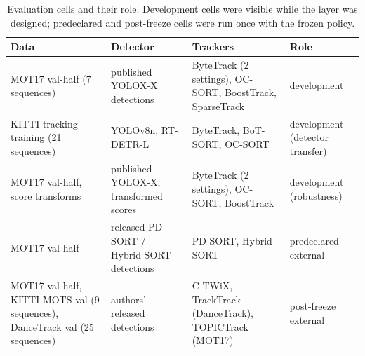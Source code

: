 \begin{table}[t]
\caption{Evaluation cells and their role. Development cells were visible while
the layer was designed; predeclared and post-freeze cells were run once with
the frozen policy.}
\label{tab:data}
\centering\footnotesize
\setlength{\tabcolsep}{4pt}
\begin{tabular}{@{}>{\raggedright\arraybackslash}p{36mm}>{\raggedright\arraybackslash}p{32mm}>{\raggedright\arraybackslash}p{50mm}>{\raggedright\arraybackslash}p{30mm}@{}}
\toprule
Data & Detector & Trackers & Role\\
\midrule
MOT17 val-half (7 sequences) & published YOLOX-X detections & ByteTrack (2 settings), OC-SORT, BoostTrack, SparseTrack & development\\
KITTI tracking training (21 sequences) & YOLOv8n, RT-DETR-L & ByteTrack, BoT-SORT, OC-SORT & development (detector transfer)\\
MOT17 val-half, score transforms & published YOLOX-X, transformed scores & ByteTrack (2 settings), OC-SORT, BoostTrack & development (robustness)\\
MOT17 val-half & released PD-SORT / Hybrid-SORT detections & PD-SORT, Hybrid-SORT & predeclared external\\
MOT17 val-half, KITTI MOTS val (9 sequences), DanceTrack val (25 sequences) & authors' released detections & C-TWiX, TrackTrack (DanceTrack), TOPICTrack (MOT17) & post-freeze external\\
\bottomrule
\end{tabular}
\end{table}
